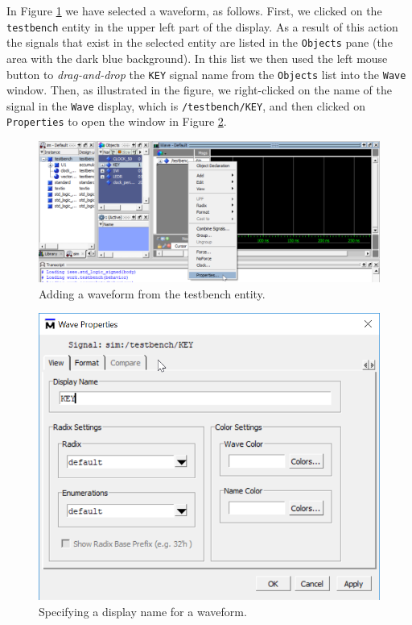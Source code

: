\documentclass[11pt, twoside, pdftex]{article}
\begin{document}
\noindent
In Figure \ref{fig:appa_fig2} we have selected a waveform, as follows. First, we clicked
on the \texttt{testbench} entity in the upper left part of the display. As a result of
this action the signals that exist in the selected entity are listed in the \texttt{Objects}
pane (the area with the dark blue background). In this list we then used the 
left mouse button to {\it drag-and-drop} the \texttt{KEY} signal name from the 
\texttt{Objects} list into the \texttt{Wave} window. Then, as illustrated in the figure, we 
right-clicked on the name of the signal in the \texttt{Wave} display, which is 
\texttt{/testbench/KEY}, and then clicked on \texttt{Properties} to open the window in 
Figure \ref{fig:appa_fig3}.

\begin{figure}[h!]
	\begin{center}
		\includegraphics[width = \textwidth]{figures/appa_fig2.png}
	\end{center}
		  \caption{Adding a waveform from the testbench entity.}
	\label{fig:appa_fig2}
\end{figure}

\begin{figure}[h]
	\begin{center}
		\includegraphics[scale=0.8]{figures/appa_fig3.png}
	\end{center}
		  \caption{Specifying a display name for a waveform.}
	\label{fig:appa_fig3}
\end{figure}
\end{document}
